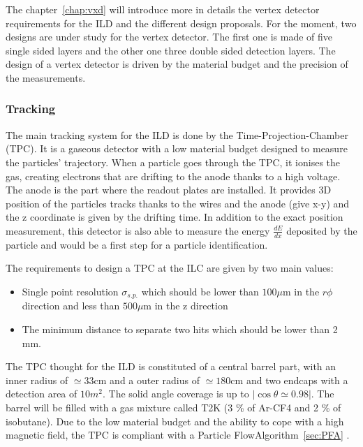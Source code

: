      The chapter~\ref{chap:vxd} will introduce more in details the vertex detector requirements for the ILD and the different design proposals. 
      For the moment, two designs are under study for the vertex detector.
      The first one is made of five single sided layers and the other one three double sided detection layers.
      The design of a vertex detector is driven by the material budget and the precision of the measurements.

      \subsubsection{Tracking}

      The main tracking system for the ILD is done by the Time-Projection-Chamber (TPC).
      It is a gaseous detector with a low material budget designed to measure the particles' trajectory.
      When a particle goes through the TPC, it ionises the gas, creating electrons that are drifting to the anode thanks to a high voltage.
      The anode is the part where the readout plates are installed.
      It provides 3D position of the particles tracks thanks to the wires and the anode (give x-y) and the z coordinate is given by the drifting time.
      In addition to the exact position measurement, this detector is also able to measure the energy $\frac{dE}{dx}$ deposited by the particle and would be a first step for a particle identification.

      The requirements to design a TPC at the ILC are given by two main values: 
      
      \begin{itemize} 
        \item Single point resolution $\sigma_{s.p.}$ which should be lower than $100 \mu\text{m}$ in the $r\phi$ direction and less than $500 \mu\text{m}$ in the z direction
        \item The minimum distance to separate two hits which should be lower than 2 mm.
      \end{itemize}

      The TPC thought for the ILD is constituted of a central barrel part, with an inner radius of $\simeq 33 \text{cm}$ and a outer radius of $\simeq 180 \text{cm}$ and two endcaps with a detection area of $10 m^2$. 
      The solid angle coverage is up to $|\cos{\theta} \simeq 0.98|$.
      The barrel will be filled with a gas mixture called T2K (3 \% of Ar-CF4 and 2 \% of isobutane).
      Due to the low material budget and the ability to cope with a high magnetic field, the TPC is compliant with a Particle FlowAlgorithm~\ref{sec:PFA} . 


